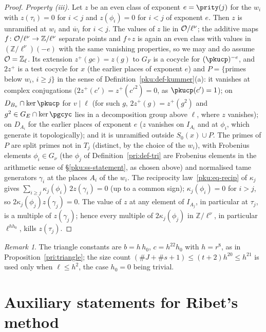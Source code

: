 \documentclass[10pt]{amsart}
\theoremstyle{definition}
\theoremstyle{remark}
\newtheorem{remark}[theorem]{Remark}
\newcommand{\Z}{\mathbb Z}
\newcommand{\Q}{\mathbb Q}
\begin{document}
\begin{proof}
\emph{Property (iii).} Let $z$ be an even class of exponent $e=\prity(j)$ for the $w_i$ with
$z(\tau_i)=0$ for $i<j$ and $z(\phi_i)=0$ for $i<j$ of exponent $e$. Then $z$ is unramified at $w_i$
and $\overline w_i$ for $i<j$. The values of $z$ lie in $\auO/\ell^\nu$; the additive maps
$f\colon\auO/\ell^\nu\to\Z/\ell^\nu$ separate points and $f\circ z$ is again an even class with values in
$(\Z/\ell^\nu)(-e)$ with the same vanishing properties, so we may and do assume $\auO=\Z_\ell$. Its
extension $z^+(gc)=z(g)$ to $G_F$ is a cocycle for
$(\pkucp)^{-e}$, and $2z^+$ is a test cocycle for $x$ (the earlier places of exponent $e$) and $P=
\{$primes below $w_i$, $i\ge j\}$ in the sense of Definition~\ref{pku:def-kummer}(a): it vanishes at
complex conjugations ($2z^+(c')=z^+(c'^2)=0$, as $\pkucp(c')=1$); on $D_{B_v}\cap\ker\pkucp$ for
$v\mid\ell$ (for such $g$, $2z^+(g)=z^+(g^2)$ and $g^2\in\pgG\cap\ker\pgcyc$ lies in a decomposition
group above $\ell$, where $z$ vanishes); on $D_{A_i}$ for the earlier places of exponent $e$ ($z$
vanishes on $I_{A_i}$ and at $\phi_i$, which generate it topologically); and it is unramified outside
$S_0(x)\cup P$. The primes of $P$ are split primes not in $T_j$ (distinct, by the choice of the
$w_i$), with Frobenius elements $\phi_i\in G_\nu$ (the $\phi_j$ of Definition~\ref{pri:def-tri} are
Frobenius elements in the arithmetic sense of \S\ref{pku:ss-statement}, as chosen above) and normalised tame
generators $\gamma_i$ at the places $A_i$ of the $w_i$. The reciprocity law~\eqref{pku:eq-recip} of $\kappa_j$ gives $\sum_{i\ge j}
\kappa_j(\phi_i)\,2z(\gamma_i)=0$ (up to a common sign); $\kappa_j(\phi_i)=0$ for $i>j$, so
$2\kappa_j(\phi_j)z(\gamma_j)=0$. The value of $z$ at any element of $I_{A_j}$, in particular at
$\tau_j$, is a multiple of $z(\gamma_j)$; hence every multiple of $2\kappa_j(\phi_j)$ in $\Z/\ell^\nu$,
in particular $\ell^{hh_0}$, kills $z(\tau_j)$.
\end{proof}

\begin{remark}\label{pku:rem-tri-source}
The triangle constants are $b=h\,h_0$, $c=h^{22}h_0$ with $h=r^8$, as in
Proposition~\ref{pri:triangle}; the size count $(\#J+\#s+1)\le(t+2)h^{20}\le h^{21}$ is used only
when $\ell\le h^2$, the case $h_0=0$ being trivial.
\end{remark}



\section{Auxiliary statements for Ribet's method}\label{C3:g7}
\providecommand{\auO}{\mathcal O}
\providecommand{\auQlb}{\overline{\Q}_\ell}
\providecommand{\auGL}{\mathrm{GL}}
\providecommand{\auF}{\mathbb F}
\providecommand{\auU}{\mathrm U}
\providecommand{\auNm}{\operatorname{Nm}}
\providecommand{\pgZb}{\overline{\Z}_\ell}
\providecommand{\pgG}{G_E}
\providecommand{\pgtr}{\operatorname{tr}}
\providecommand{\pgFrob}{\operatorname{Frob}}
\providecommand{\priX}{\mathcal X}
\providecommand{\priT}{\mathbb T}
\providecommand{\pgNch}{N_{\mathrm{ch}}}
\providecommand{\pgaWD}{\operatorname{WD}}
\providecommand{\auf}[1]{\texttt{#1}}
\providecommand{\paxch}{\operatorname{ch}}
\providecommand{\paxL}{\mathcal L}
\end{document}
